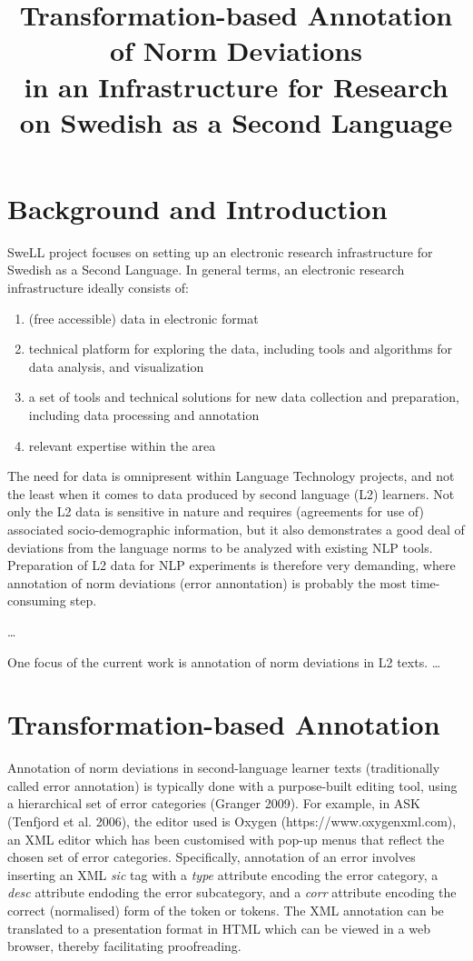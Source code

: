 \documentclass[10pt, a4paper]{article}
\title{Transformation-based Annotation of Norm Deviations \\ in an Infrastructure for Research on Swedish as a Second Language}
\begin{document}
\maketitleabstract

\section{Background and Introduction}

SweLL project focuses on setting up an electronic research infrastructure for Swedish as a Second Language. In general terms, an electronic research infrastructure ideally consists of:
\begin{enumerate}
\item  (free accessible) data in electronic format
\item  technical platform for exploring the data, including tools and algorithms for data analysis,  and visualization
\item a set of tools and technical solutions for new data collection and preparation, including data processing and annotation
\item  relevant expertise within the area
\end{enumerate}


The need for data is omnipresent within Language Technology projects, and not the least when it comes to data produced by second language (L2) learners. Not only the L2 data is sensitive in nature and requires (agreements for use of) associated socio-demographic information, but it also demonstrates a good deal of deviations from the language norms to be analyzed with existing NLP tools. Preparation of L2 data for NLP experiments is therefore very demanding, where annotation of norm deviations (error annontation) is probably the most time-consuming step. 

 \ldots
 
One focus of the current work is annotation of norm deviations in L2 texts. \ldots

\section{Transformation-based Annotation}

Annotation of norm deviations in second-language learner texts (traditionally called error annotation) is typically done with a purpose-built editing tool, using a hierarchical set of error categories (Granger 2009). For example, in ASK (Tenfjord et al. 2006), the editor used is Oxygen (https://www.oxygenxml.com), an XML editor which has been customised with pop-up menus that reflect the chosen set of error categories. Specifically, annotation of an error involves inserting an XML {\em sic} tag with a {\em type} attribute encoding the error category, a {\em desc} attribute endoding the error subcategory, and a {\em corr} attribute encoding the correct (normalised) form of the token or tokens. The XML annotation can be translated to a presentation format in HTML which can be viewed in a web browser, thereby facilitating proofreading.
\end{document}
